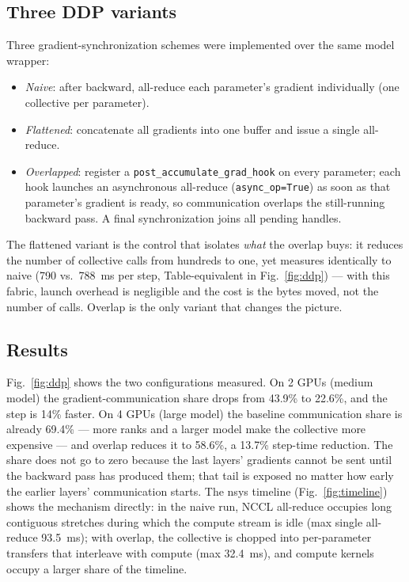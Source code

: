 \documentclass{article}
\begin{document}
\subsection{Three DDP variants}

Three gradient-synchronization schemes were implemented over the same model wrapper:

\begin{itemize}
  \item \emph{Naive}: after backward, all-reduce each parameter's gradient individually (one collective per parameter).
  \item \emph{Flattened}: concatenate all gradients into one buffer and issue a single all-reduce.
  \item \emph{Overlapped}: register a \texttt{post\_accumulate\_grad\_hook} on every parameter; each hook launches an asynchronous all-reduce (\texttt{async\_op=True}) as soon as that parameter's gradient is ready, so communication overlaps the still-running backward pass. A final synchronization joins all pending handles.
\end{itemize}

The flattened variant is the control that isolates \emph{what} the overlap buys: it reduces the number of collective calls from hundreds to one, yet measures identically to naive (790 vs.\ 788~ms per step, Table-equivalent in Fig.~\ref{fig:ddp}) --- with this fabric, launch overhead is negligible and the cost is the bytes moved, not the number of calls. Overlap is the only variant that changes the picture.

\subsection{Results}

Fig.~\ref{fig:ddp} shows the two configurations measured. On 2 GPUs (medium model) the gradient-communication share drops from 43.9\% to 22.6\%, and the step is 14\% faster. On 4 GPUs (large model) the baseline communication share is already 69.4\% --- more ranks and a larger model make the collective more expensive --- and overlap reduces it to 58.6\%, a 13.7\% step-time reduction. The share does not go to zero because the last layers' gradients cannot be sent until the backward pass has produced them; that tail is exposed no matter how early the earlier layers' communication starts. The nsys timeline (Fig.~\ref{fig:timeline}) shows the mechanism directly: in the naive run, NCCL all-reduce occupies long contiguous stretches during which the compute stream is idle (max single all-reduce 93.5~ms); with overlap, the collective is chopped into per-parameter transfers that interleave with compute (max 32.4~ms), and compute kernels occupy a larger share of the timeline.
\end{document}
